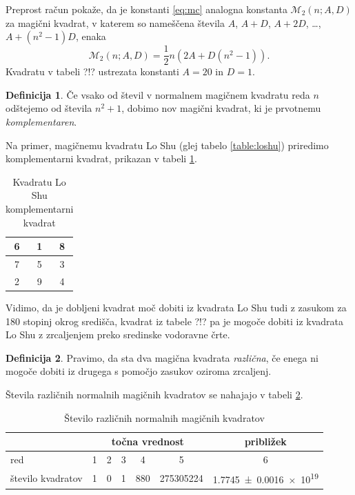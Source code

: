 \documentclass[a4paper,12pt]{article}
\newcommand{\m}{\mathcal{M}_2}
\newcommand{\pojem}[1]{\emph{\color{purple}#1}}
\newenvironment{magic}[3]
{
    \begin{table}[!ht]
    \centering
    \caption{#2}
    \label{#3}
    \large
    \begin{tabular}{|*{#1}{c|}}
    \hline
}
{
    \end{tabular}
    \normalsize
    \end{table}
}
\theoremstyle{definition}
\newtheorem{definicija}{Definicija}
\theoremstyle{plain}
\begin{document}
Preprost račun pokaže, da je konstanti \eqref{eq:mc} analogna konstanta
\(\m(n;A,D)\) za magični kvadrat, v katerem so nameščena števila
\(A\), \(A+D\), \(A+2D\), \ldots, \(A+(n^2-1)D\), enaka
\[
   \m(n;A,D) = \frac{1}{2} n \left(2A+D(n^2-1)\right).
\]
Kvadratu v tabeli ?!? ustrezata konstanti \(A=20\) in \(D=1\). %

\begin{definicija}
   Če vsako od števil v normalnem magičnem kvadratu reda \(n\) odštejemo
   od števila \(n^2+1\), dobimo nov magični kvadrat, ki je prvotnemu
   \pojem{komplementaren}.
\end{definicija}

Na primer, magičnemu kvadratu Lo Shu (glej tabelo \ref{table:loshu}) priredimo
komplementarni kvadrat, prikazan v tabeli \ref{table:closhu}. 
%
\begin{magic}{3}{Kvadratu Lo Shu komplementarni kvadrat}{table:closhu}
    6 & 1 & 8 \\ \hline
    7 & 5 & 3 \\ \hline
    2 & 9 & 4 \\ \hline
\end{magic}

Vidimo, da je dobljeni kvadrat moč dobiti iz kvadrata Lo Shu tudi z zasukom za
180 stopinj okrog središča, kvadrat iz tabele ?!? pa je mogoče dobiti
iz kvadrata Lo Shu z zrcaljenjem preko sredinske vodoravne črte. %

\begin{definicija}
   Pravimo, da sta dva magična kvadrata \pojem{različna}, če enega ni mogoče dobiti
   iz drugega s pomočjo zasukov oziroma zrcaljenj.
\end{definicija}

Števila različnih normalnih magičnih kvadratov se nahajajo v tabeli \ref{table:stevila}.

\begin{table}[!ht]
   \centering
   \caption{Število različnih normalnih magičnih kvadratov}
   \label{table:stevila}
   \begin{tabular}{lcccccc}\toprule
      & \multicolumn{5}{c}{točna vrednost} & približek \\
      \midrule
      red & 1 & 2 & 3 & 4 & 5 & 6 \\
      število kvadratov & 1 & 0 & 1 & 880 & \num{275305224} & \num[separate-uncertainty]{1.7745 \pm 0.0016 e19} \\
      \bottomrule
   \end{tabular}
\end{table}
\end{document}
